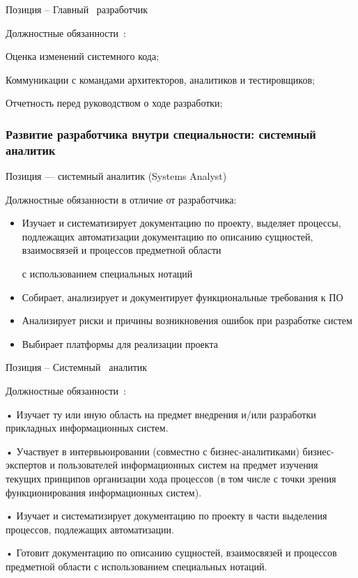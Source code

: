 \documentclass{../industrial-development}
\begin{document}
\lecturenotes

Позиция – Главный~\cite{hh} разработчик~\cite{itcf}

Должностные обязанности~\cite{rab}:

Оценка изменений системного кода;

Коммуникации с командами архитекторов, аналитиков и тестировщиков;

Отчетность перед руководством о ходе разработки; 

\begin{frame} \frametitle{Развитие разработчика внутри специальности: системный аналитик}
 \begin{block}{}
  \alert{Позиция --- системный аналитик (Systems Analyst)}

Должностные обязанности в отличие от разработчика: 
  \end{block}
  \begin{itemize}
\item  Изучает и систематизирует документацию по проекту, выделяет процессы, подлежащих автоматизации
   документацию по описанию сущностей, взаимосвязей и процессов предметной области 

с использованием специальных нотаций
  \item Собирает, анализирует и документирует функциональные требования к ПО
 \item  Анализирует риски и причины возникновения ошибок при разработке систем
 \item Выбирает платформы для реализации проекта
  \end{itemize}
\end{frame}

\lecturenotes

Позиция – Системный~\cite{hh} аналитик~\cite{itcf}

Должностные обязанности~\cite{rab}:

•	Изучает ту или иную область на предмет внедрения и/или разработки прикладных информационных систем. 

•	Участвует в интервьюировании (совместно с бизнес-аналитиками) бизнес-экспертов и пользователей информационных систем на предмет изучения текущих принципов организации хода процессов (в том числе с точки зрения функционирования информационных систем). 

•	Изучает и систематизирует документацию по проекту в части выделения процессов, подлежащих автоматизации. 

•	Готовит документацию по описанию сущностей, взаимосвязей и процессов предметной области с использованием специальных нотаций. 
\end{document}
